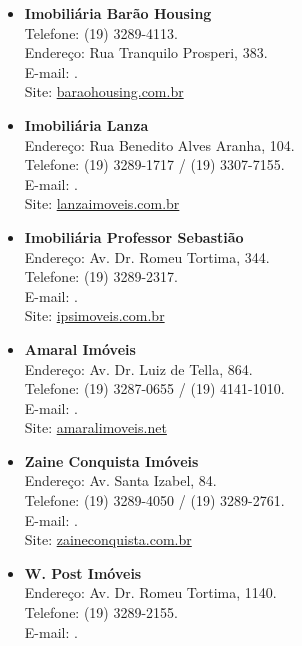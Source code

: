 \begin{itemize}
\item   \textbf{Imobiliária Barão Housing}
        \\Telefone: (19) 3289-4113.
        \\Endereço: Rua Tranquilo Prosperi, 383.
        \\E-mail: .
        \\Site: \url{baraohousing.com.br}

\item   \textbf{Imobiliária Lanza}
		\\Endereço: Rua Benedito Alves Aranha, 104.
		\\Telefone: (19) 3289-1717 / (19) 3307-7155.
		\\E-mail: .
		\\Site: \url{lanzaimoveis.com.br}

\item   \textbf{Imobiliária Professor Sebastião}
		\\Endereço: Av. Dr. Romeu Tortima, 344.
		\\Telefone: (19) 3289-2317.
		\\E-mail: .
		\\Site: \url{ipsimoveis.com.br}

\item   \textbf{Amaral Imóveis}
		\\Endereço: Av. Dr. Luiz de Tella, 864.
		\\Telefone: (19) 3287-0655 / (19) 4141-1010.
		\\E-mail: .
		\\Site: \url{amaralimoveis.net}

\item   \textbf{Zaine Conquista Imóveis}
		\\Endereço: Av. Santa Izabel, 84.
		\\Telefone: (19) 3289-4050 / (19) 3289-2761.
		\\E-mail: .
		\\Site: \url{zaineconquista.com.br}

\item   \textbf{W. Post Imóveis}
		\\Endereço: Av. Dr. Romeu Tortima, 1140.
		\\Telefone: (19) 3289-2155.
		\\E-mail: .


\end{itemize}
